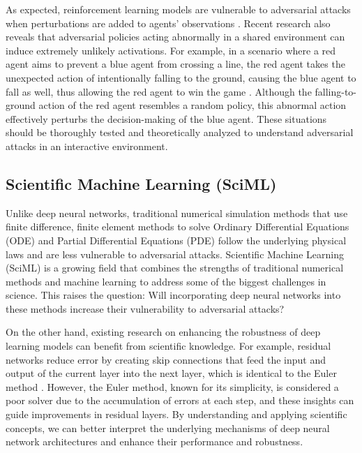 As expected, reinforcement learning models are vulnerable to adversarial attacks when perturbations are added to agents' observations \citep{chen2019adversarial}. Recent research also reveals that adversarial policies acting abnormally in a shared environment can induce extremely unlikely activations. For example, in a scenario where a red agent aims to prevent a blue agent from crossing a line, the red agent takes the unexpected action of intentionally falling to the ground, causing the blue agent to fall as well, thus allowing the red agent to win the game \citep{gleave2021adversarial}. Although the falling-to-ground action of the red agent resembles a random policy, this abnormal action effectively perturbs the decision-making of the blue agent. These situations should be thoroughly tested and theoretically analyzed to understand adversarial attacks in an interactive environment.

\subsection{Scientific Machine Learning (SciML)}

Unlike deep neural networks, traditional numerical simulation methods that use finite difference, finite element methods to solve Ordinary Differential Equations (ODE) and Partial Differential Equations (PDE) follow the underlying physical laws and are less vulnerable to adversarial attacks. Scientific Machine Learning (SciML) is a growing field that combines the strengths of traditional numerical methods and machine learning to address some of the biggest challenges in science. This raises the question: Will incorporating deep neural networks into these methods increase their vulnerability to adversarial attacks? 


On the other hand, existing research on enhancing the robustness of deep learning models can benefit from scientific knowledge. For example, residual networks reduce error by creating skip connections that feed the input and output of the current layer into the next layer, which is identical to the Euler method \citep{chen2018neural}. However, the Euler method, known for its simplicity, is considered a poor solver due to the accumulation of errors at each step, and these insights can guide improvements in residual layers. By understanding and applying scientific concepts, we can better interpret the underlying mechanisms of deep neural network architectures and enhance their performance and robustness.

